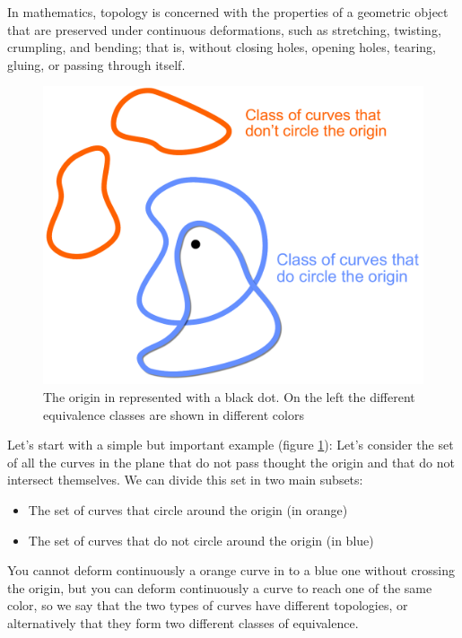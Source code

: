 \label{sec:no_flat}
In mathematics, topology is concerned with the properties of a geometric object that are preserved under continuous deformations, such as stretching, twisting, crumpling, and bending; that is, without closing holes, opening holes, tearing, gluing, or passing through itself.\\
\begin{figure}
    \includegraphics[width=.6\textwidth]{Immagini/topo/topo1.pdf}
    \caption{The origin in represented with a black dot. On the left the different equivalence classes are shown in different colors}
    \label{fig:topo1}
\end{figure} 
Let's start with a simple but important example (figure \ref{fig:topo1}):
Let's consider the set of all the curves in the plane that do not pass thought the origin and that do not intersect themselves. We can divide this set in two main subsets:
\begin{itemize}
    \item The set of curves that circle around the origin (in orange)
    \item The set of curves that do not circle around the origin (in blue)
\end{itemize}
You cannot deform continuously a orange curve in to a blue one without crossing the origin, but you can deform continuously a curve to reach one of the same color, so we say that the two types of curves have different topologies, or alternatively that they form two different classes of equivalence.

